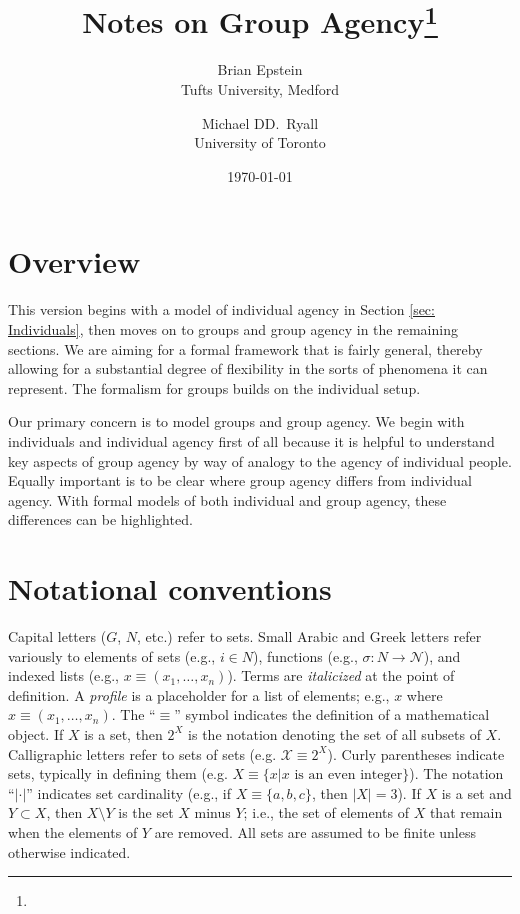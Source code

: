 \documentclass[
11pt,
titlepage,
reqno,
]{article}%
\theoremstyle{definition}
\begin{document}
	
	\title{Notes on Group Agency\thanks{}
	}
	\author
	{
		Brian Epstein \\Tufts University, Medford
		\and 
		Michael DD.\ Ryall \\University of Toronto 
	}
	\date{\today}
	\maketitle
	
	
	
	\def\baselinestretch{1.5}\small\normalsize
	
	\newpage
	\section{Overview}
	This version begins with a model of individual agency in Section \ref{sec: Individuals}, then moves on to groups and group agency in the remaining sections. 
	We are aiming for a  formal framework that is fairly general, thereby allowing for a substantial degree of flexibility in the sorts of phenomena it can represent.  
	The formalism for groups builds on the individual setup. 
	
	Our primary concern is to model groups and group agency. 
	We begin with individuals and individual agency first of all because it is helpful to understand key aspects of group agency by way of analogy to the agency of individual people. 
	Equally important is to be clear where group agency differs from individual agency. 
	With formal models of both individual and group agency, these differences can be highlighted. 
	
	
	\section{Notational conventions}
	Capital letters ($G$, $N$, etc.) refer to sets.  
	Small Arabic and Greek letters refer variously to elements of sets (e.g., $i\in N$), functions (e.g., $\sigma:N\rightarrow \mathcal{N}$), and indexed lists (e.g., $x\equiv(x_1,\ldots,x_n)$). 
	Terms  are \textit{italicized} at the point of definition.  
	A \textit{profile} is a placeholder for a list of elements; e.g., $x$ where $x\equiv(x_1,\ldots,x_n)$. 
	The ``$\equiv$'' symbol indicates the definition of a mathematical object. 
	If $X$ is a set, then $2^X$ is the notation denoting the set of all subsets of $X$. Calligraphic letters refer to sets of sets (e.g. $\mathcal{X}\equiv 2^X$). 
	Curly parentheses indicate sets, typically in defining them (e.g. $X\equiv\{x|x\text{ is an even integer}\}$). 
	The notation ``$|\cdot|$'' indicates set cardinality (e.g., if $X\equiv\{a,b,c\}$, then $|X|=3$). 
	If $X$ is a set and $Y\subset X$, then $X\setminus Y$ is the set $X$ minus $Y$; i.e., the set of elements of $X$ that  remain when the elements of $Y$ are removed. 
	All sets are assumed to be finite unless otherwise indicated.
	
\end{document}
